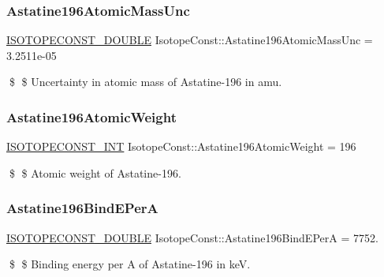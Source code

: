\subsubsection{\texorpdfstring{Astatine196\+Atomic\+Mass\+Unc}{Astatine196AtomicMassUnc}}
{\footnotesize\ttfamily \mbox{\hyperlink{group___isotope_const-_macros_ga8f45a7272ce02c0b4c65c44636ed719a}{I\+S\+O\+T\+O\+P\+E\+C\+O\+N\+S\+T\+\_\+\+D\+O\+U\+B\+LE}} Isotope\+Const\+::\+Astatine196\+Atomic\+Mass\+Unc = 3.\+2511e-\/05}

\$ \$ Uncertainty in atomic mass of Astatine-\/196 in amu. \mbox{\label{group___isotope_const-_astatine-_at196_ga3c38dba09b20d68f138938f843c1b003}} 
\subsubsection{\texorpdfstring{Astatine196\+Atomic\+Weight}{Astatine196AtomicWeight}}
{\footnotesize\ttfamily \mbox{\hyperlink{group___isotope_const-_macros_ga5f18360b3e99483a35c32d789e62621c}{I\+S\+O\+T\+O\+P\+E\+C\+O\+N\+S\+T\+\_\+\+I\+NT}} Isotope\+Const\+::\+Astatine196\+Atomic\+Weight = 196}

\$ \$ Atomic weight of Astatine-\/196. \mbox{\label{group___isotope_const-_astatine-_at196_gae7d8965989480c0073e0343260407182}} 
\subsubsection{\texorpdfstring{Astatine196\+Bind\+E\+PerA}{Astatine196BindEPerA}}
{\footnotesize\ttfamily \mbox{\hyperlink{group___isotope_const-_macros_ga8f45a7272ce02c0b4c65c44636ed719a}{I\+S\+O\+T\+O\+P\+E\+C\+O\+N\+S\+T\+\_\+\+D\+O\+U\+B\+LE}} Isotope\+Const\+::\+Astatine196\+Bind\+E\+PerA = 7752.}

\$ \$ Binding energy per A of Astatine-\/196 in keV. \mbox{\label{group___isotope_const-_astatine-_at196_ga36f0faa143ff537f47cdcf969e45f616}} 
